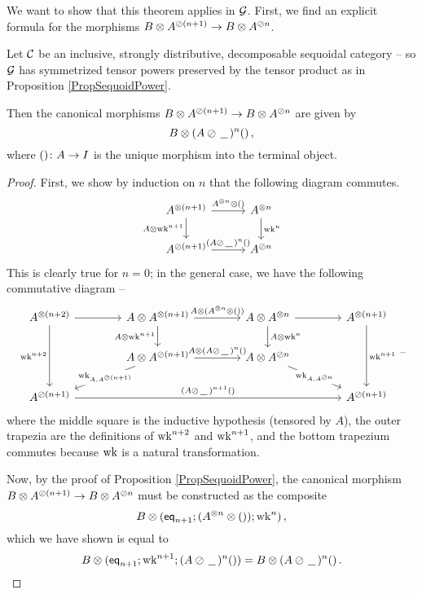 \documentclass[11pt]{report}
\begin{document}
We want to show that this theorem applies in $\mathcal G$.
First, we find an explicit formula for the morphisms $B \otimes A^{\oslash(n+1)}\to B\otimes A^{\oslash n}$.

\begin{proposition}
  Let ${\mathcal{C}}$ be an inclusive, strongly distributive, decomposable sequoidal category -- so $\mathcal G$ has symmetrized tensor powers preserved by the tensor product as in Proposition \ref{PropSequoidPower}.  

  Then the canonical morphisms $B \otimes A^{\oslash (n+1)}\to B\otimes A^{\oslash n}$ are given by
  \[
    B \otimes (A \oslash \,\underline{\hspace{1.5ex}}\,)^n()\,,
    \]
  where $() \colon A \to I$ is the unique morphism into the terminal object.
\end{proposition}
\begin{proof}
  First, we show by induction on $n$ that the following diagram commutes.
  \[
    \begin{tikzcd}[column sep=30pt]
      A^{\tensor(n+1)} \arrow[r, "A^{\tensor n}\tensor()"] \arrow[d, "A\tensor\wk^{n+1}"']
        & A^{\tensor n} \arrow[d, "\wk^n"] \\
      A^{\sequoid(n+1)} \arrow[r, "(A\sequoid\blank)^n()"]
        & A^{\sequoid n}
    \end{tikzcd}
    \]
  This is clearly true for $n=0$; in the general case, we have the following commutative diagram --
  \[
    \begin{tikzcd}[column sep=41pt]
      A^{\tensor(n+2)} \arrow[r] \arrow[dd, "\wk^{n+2}"']
        & A \tensor A^{\tensor (n+1)} \arrow[r, "A \tensor (A^{\tensor n}\tensor ())"] \arrow[d, "A \tensor \wk^{n+1}"']
          & A \tensor A^{\tensor n} \arrow[r] \arrow[d, "A\tensor \wk^n"]
            & A^{\tensor(n+1)} \arrow[dd, "\wk^{n+1}"] \\
        & A \tensor A^{\sequoid (n+1)} \arrow[r, "A \tensor (A\sequoid\blank)^n()"] \arrow[dl, "{\wk_{A,A^{\sequoid (n+1)}}}" description]
          & A \tensor A^{\sequoid n} \arrow[dr, "{\wk_{A,A^{\sequoid n}}}" description]
            & \\
      A^{\sequoid(n+1)} \arrow[rrr, "(A \sequoid \blank)^{n+1}()"]
        &
          &
            & A^{\sequoid (n+1)}
    \end{tikzcd}\,\text{--}
    \]
  where the middle square is the inductive hypothesis (tensored by $A$), the outer trapezia are the definitions of $\operatorname{wk}^{n+2}$ and $\operatorname{wk}^{n+1}$, and the bottom trapezium commutes because $\operatorname{wk}$ is a natural transformation.

  Now, by the proof of Proposition \ref{PropSequoidPower}, the canonical morphism $B\otimes A^{\oslash (n+1)} \to B\otimes A^{\oslash n}$ must be constructed as the composite
  \[
    B \otimes ({\mathsf{eq}}_{n+1};(A^{\otimes n}\otimes ());\operatorname{wk}^n)\,,
    \]
  which we have shown is equal to
  \[
    B \otimes ({\mathsf{eq}}_{n+1};\operatorname{wk}^{n+1};(A \oslash\,\underline{\hspace{1.5ex}}\,)^n()) = B \otimes (A \oslash\,\underline{\hspace{1.5ex}}\,)^n()\,.\qedhere
    \]
\end{proof}
\end{document}
